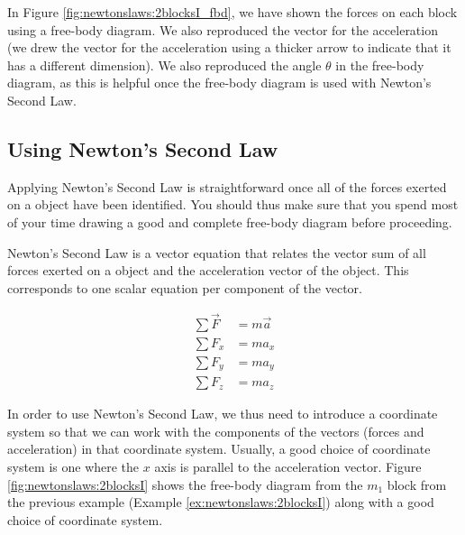 \begin{example}
In Figure \ref{fig:newtonslaws:2blocksI_fbd}, we have shown the forces on each block using a free-body diagram. We also reproduced the vector for the acceleration (we drew the vector for the acceleration using a thicker arrow to indicate that it has a different dimension). We also reproduced the angle $\theta$ in the free-body diagram, as this is helpful once the free-body diagram is used with Newton's Second Law.

\end{example}

\subsection{Using Newton's Second Law}
Applying Newton's Second Law is straightforward once all of the forces exerted on a object have been identified. You should thus make sure that you spend most of your time drawing a good and complete free-body diagram before proceeding.

Newton's Second Law is a vector equation that relates the vector sum of all forces exerted on a object and the acceleration vector of the object. This corresponds to one scalar equation per component of the vector.

\begin{align*}
\sum \vec F &=m\vec a\\
\sum F_x &= ma_x \\
\sum F_y &= ma_y \\
\sum F_z &= ma_z
\end{align*}

In order to use Newton's Second Law, we thus need to introduce a coordinate system so that we can work with the components of the vectors (forces and acceleration) in that coordinate system. Usually, a good choice of coordinate system is one where the $x$ axis is parallel to the acceleration vector. Figure \ref{fig:newtonslaws:2blocksI} shows the free-body diagram from the $m_1$ block from the previous example (Example \ref{ex:newtonslaws:2blocksI}) along with a good choice of coordinate system. 


